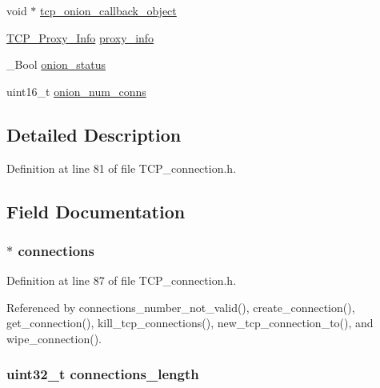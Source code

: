 \begin{DoxyCompactItemize}
\item 
void $\ast$ \hyperlink{struct_t_c_p___connections_a16e85b0c2c930afee6a25f7229c7116e}{tcp\+\_\+onion\+\_\+callback\+\_\+object}
\item 
\hyperlink{struct_t_c_p___proxy___info}{T\+C\+P\+\_\+\+Proxy\+\_\+\+Info} \hyperlink{struct_t_c_p___connections_aa737023350cf47e63993e3b4dc9a7472}{proxy\+\_\+info}
\item 
\+\_\+\+Bool \hyperlink{struct_t_c_p___connections_a4eead70704aaec336687c7a248a22522}{onion\+\_\+status}
\item 
uint16\+\_\+t \hyperlink{struct_t_c_p___connections_a6e6576b39dc12d06b344fae03ba2d772}{onion\+\_\+num\+\_\+conns}
\end{DoxyCompactItemize}


\subsection{Detailed Description}


Definition at line 81 of file T\+C\+P\+\_\+connection.\+h.



\subsection{Field Documentation}
\hypertarget{struct_t_c_p___connections_a191cfbdd509a2705455744965ccfd724}{
\subsubsection[{connections}]{$\ast$ connections}}\label{struct_t_c_p___connections_a191cfbdd509a2705455744965ccfd724}


Definition at line 87 of file T\+C\+P\+\_\+connection.\+h.



Referenced by connections\+\_\+number\+\_\+not\+\_\+valid(), create\+\_\+connection(), get\+\_\+connection(), kill\+\_\+tcp\+\_\+connections(), new\+\_\+tcp\+\_\+connection\+\_\+to(), and wipe\+\_\+connection().

\hypertarget{struct_t_c_p___connections_a6c469b329395b7dfc09fc49900bf8f0d}{
\subsubsection[{connections\+\_\+length}]{\setlength{\rightskip}{0pt plus 5cm}uint32\+\_\+t connections\+\_\+length}}\label{struct_t_c_p___connections_a6c469b329395b7dfc09fc49900bf8f0d}


